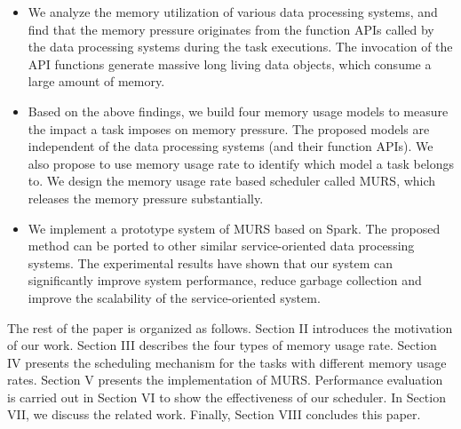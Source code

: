 \begin{itemize}

\item We analyze the memory utilization of various data processing systems, and find that the memory pressure originates from the function APIs called by the data processing systems during the task executions. The invocation of the API functions generate massive long living data objects, which consume a large amount of memory. 


\item Based on the above findings, we build four memory usage models to measure the impact a task imposes on memory pressure. The proposed models are independent of the data processing systems (and their function APIs). We also propose to use memory usage rate to identify which model a task belongs to. We design the memory usage rate based scheduler called MURS, which releases the memory pressure substantially.


\item We implement a prototype system of MURS based on Spark. The proposed method can be ported to other similar service-oriented data processing systems. The experimental results have shown that our system can significantly improve system performance, reduce garbage collection and improve the scalability of the service-oriented system.

\end{itemize}

The rest of the paper is organized as follows. Section II introduces the motivation of our work. Section III describes the four types of memory usage rate. Section IV presents the scheduling mechanism for the tasks with different memory usage rates. Section V presents the implementation of MURS. Performance evaluation is carried out in Section VI to show the effectiveness of our scheduler. In Section VII, we discuss the related work. Finally, Section VIII concludes this paper.